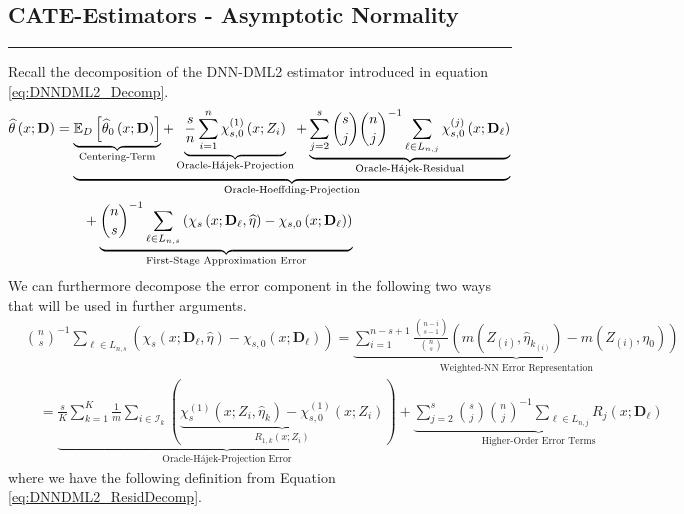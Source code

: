 \subsection{CATE-Estimators - Asymptotic Normality}
\hrule
Recall the decomposition of the DNN-DML2 estimator introduced in equation \ref{eq:DNNDML2_Decomp}.
\begin{equation}
    \begin{aligned}
        \widehat{\theta}\left(x; \mathbf{D}\right)
        & = \underbrace{\underbrace{\mathbb{E}_{D}\left[\widehat{\theta}_{0}\left(x; \mathbf{D}\right)\right]}_{\text{Centering-Term}}
        + \underbrace{\frac{s}{n}\sum_{i = 1}^{n} \chi_{s,0}^{(1)}\left(x; Z_{i}\right)}_{\text{Oracle-H\'ajek-Projection}}
        + \underbrace{\sum_{j = 2}^{s} \binom{s}{j} \binom{n}{j}^{-1}\sum_{\ell \in L_{n,j}} \chi_{s,0}^{(j)}\left(x; \mathbf{D}_{\ell}\right)}_{\text{Oracle-H\'ajek-Residual}}}_{\text{Oracle-Hoeffding-Projection}}\\
        & \quad \quad + \underbrace{\binom{n}{s}^{-1}\sum_{\ell \in L_{n,s}}\left(\chi_{s}\left(x; \mathbf{D}_{\ell}, \widehat{\eta}\right) - \chi_{s,0}\left(x; \mathbf{D}_{\ell}\right)\right)}_{\text{First-Stage Approximation Error}}
    \end{aligned}
\end{equation}
We can furthermore decompose the error component in the following two ways that will be used in further arguments.
\begin{equation}
    \begin{aligned}
        & \binom{n}{s}^{-1} \sum_{\ell \in L_{n,s}}\left(\chi_{s}\left(x; \mathbf{D}_{\ell}, \hat{\eta}\right) - \chi_{s,0}\left(x; \mathbf{D}_{\ell}\right)\right)
        = \underbrace{\sum_{i = 1}^{n - s + 1} \frac{\binom{n-i}{s-1}}{\binom{n}{s}} \left(m(Z_{(i)}, \hat{\eta}_{k_{(i)}}) - m(Z_{(i)}, \eta_{0})\right)}_{\text{Weighted-NN Error Representation}} \\
        & \quad = \underbrace{\frac{s}{K} \sum_{k = 1}^{K} \frac{1}{m} \sum_{i \in \mathcal{I}_{k}}\left(\underbrace{\chi_{s}^{(1)}\left(x; Z_{i}, \hat{\eta}_{k}\right) - \chi_{s,0}^{(1)}\left(x; Z_{i}\right)}_{R_{1,k}\left(x; Z_{i}\right)}\right)}_{\text{Oracle-H\'ajek-Projection Error}}
         + \underbrace{\sum_{j = 2}^{s} \binom{s}{j} \binom{n}{j}^{-1}\sum_{\ell \in L_{n,j}} R_{j}\left(x; \mathbf{D}_{\ell}\right)}_{\text{Higher-Order Error Terms}}
    \end{aligned}
\end{equation}
where we have the following definition from Equation \ref{eq:DNNDML2_ResidDecomp}.
